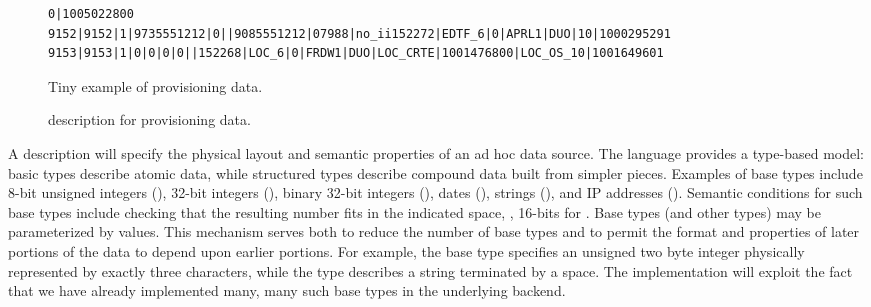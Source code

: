 \documentclass[11pt]{article}
\begin{document}
\begin{figure*}
\begin{small}
\begin{verbatim}
0|1005022800
9152|9152|1|9735551212|0||9085551212|07988|no_ii152272|EDTF_6|0|APRL1|DUO|10|1000295291
9153|9153|1|0|0|0|0||152268|LOC_6|0|FRDW1|DUO|LOC_CRTE|1001476800|LOC_OS_10|1001649601
\end{verbatim}
\caption{Tiny example of \dibbler{} provisioning data.}
\label{figure:dibbler-records}
\end{small}
\end{figure*}

\suppressfloats


\begin{figure}
\begin {code}

\end{code}
\caption{\datatype{} description for \dibbler{} provisioning data.}
\label{figure:dibblerml}
\end{figure}


A \datatype{} description will specify the physical layout and 
semantic properties of an ad hoc data source. 
The language provides a type-based model:
basic types describe atomic data, while
structured types describe compound data built from simpler pieces.
Examples of base
types include 8-bit unsigned integers (), 32-bit
integers (), binary 32-bit integers (),
dates (), strings (),
and IP addresses ().  Semantic conditions for such base types
include checking that the resulting number fits in the indicated
space, \ie, 16-bits for .  
%
%
Base types (and other types) may be parameterized by values.  
This mechanism serves
both to reduce the number of base types and to permit the format and
properties of later portions of the data to depend upon earlier
portions.  For example, the base type  specifies
an unsigned two byte integer physically represented by exactly three
characters, while the type  describes a string
terminated by a space.  The \datatype{} implementation 
will exploit the fact that we have already implemented many,
many such base types in the underlying \pads{} backend.  
\end{document}
